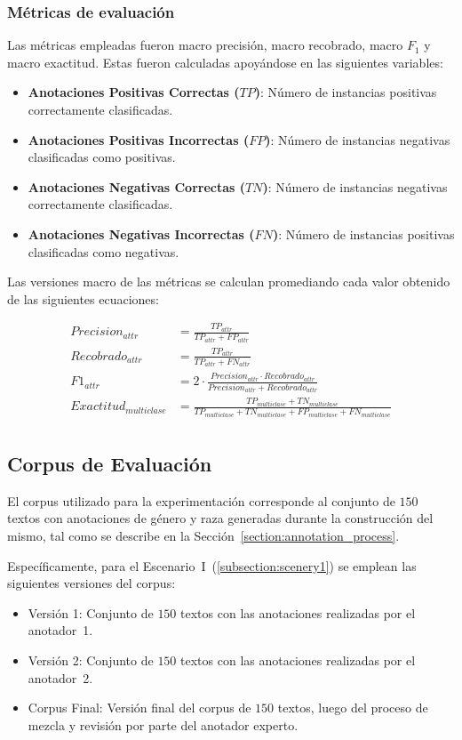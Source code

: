\subsubsection{M\'etricas de evaluaci\'on}
Las m\'etricas empleadas fueron macro precisi\'on, macro recobrado, macro $F_1$ y 
macro exactitud. Estas fueron calculadas apoy\'andose en las siguientes variables: 

\begin{itemize}
    \item \textbf{Anotaciones Positivas Correctas ($TP$)}: N\'umero de instancias positivas correctamente clasificadas.
    \item \textbf{Anotaciones Positivas Incorrectas ($FP$)}: N\'umero de instancias negativas clasificadas como positivas.
    \item \textbf{Anotaciones Negativas Correctas ($TN$)}: N\'umero de instancias negativas correctamente clasificadas.
    \item \textbf{Anotaciones Negativas Incorrectas ($FN$)}: N\'umero de instancias positivas clasificadas como negativas.
\end{itemize}

Las versiones macro de las m\'etricas se calculan promediando cada valor obtenido de las siguientes ecuaciones:

\begin{align}
    Precision_{attr} &= \frac{TP_{attr}}{TP_{attr} + FP_{attr}}\\
    Recobrado_{attr} &= \frac{TP_{attr}}{TP_{attr} + FN_{attr}}\\
    F1_{attr} &= 2 \cdot \frac{{Precision_{attr}} \cdot {Recobrado_{attr}}}{{Precision_{attr}} + {Recobrado_{attr}}}\\
    Exactitud_{multiclase} &= \frac{TP_{multiclase} + TN_{multiclase}}{TP_{multiclase} + TN_{multiclase} + FP_{multiclase} + FN_{multiclase}}\\
\end{align}


\subsection{Corpus de Evaluaci\'on}
El corpus utilizado para la experimentaci\'on corresponde al conjunto de $150$ textos con anotaciones de g\'enero y raza
generadas durante la construcci\'on del mismo, tal como se describe en la Secci\'on~\ref{section:annotation_process}.

Espec\'ificamente, para el Escenario~I~(\ref{subsection:scenery1}) se emplean las siguientes versiones del corpus:
\begin{itemize}
    \item Versi\'on 1: Conjunto de $150$ textos con las anotaciones realizadas por el anotador~1.
    \item Versi\'on 2: Conjunto de $150$ textos con las anotaciones realizadas por el anotador~2.
    \item Corpus Final: Versi\'on final del corpus de $150$ textos, luego del proceso de mezcla y revisi\'on por parte 
    del anotador experto.
\end{itemize}

